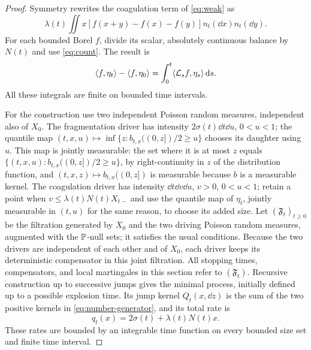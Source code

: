 \begin{proof}
Symmetry rewrites the coagulation term of \eqref{eq:weak} as
\[
 \lambda(t)\iint x[f(x+y)-f(x)-f(y)]n_t(\dd x)n_t(\dd y).
\]
For each bounded Borel $f$, divide its scalar, absolutely continuous
balance by $N(t)$ and use \eqref{eq:count}. The result is
\begin{equation}
 \langle f,\eta_t\rangle-\langle f,\eta_0\rangle
 =\int_0^t\langle \mathcal L_s f,\eta_s\rangle\,\mathrm d s.
 \label{eq:number-forward}
\end{equation}
All these integrals are finite on bounded time intervals.

For the construction use two independent Poisson random measures,
independent also of $X_0$. The fragmentation driver has intensity
$2\sigma(t)\dd t\dd u$, $0<u<1$; the quantile map
$(t,x,u)\mapsto\inf\{z:b_{t,x}((0,z])/2\geq u\}$ chooses its
daughter using $u$. This map is jointly measurable: the set where
it is at most $z$ equals $\{(t,x,u):b_{t,x}((0,z])/2\geq u\}$,
by right-continuity in $z$ of the distribution function, and
$(t,x,z)\mapsto b_{t,x}((0,z])$ is measurable because $b$ is a
measurable kernel. The coagulation driver has
intensity $\dd t\dd v\dd u$, $v>0$, $0<u<1$; retain a point when
$v\leq\lambda(t)N(t)X_{t-}$ and use the quantile map of $\eta_t$,
jointly measurable in $(t,u)$ for the same reason, to choose its
added size. Let $(\mathfrak F_t)_{t\geq0}$ be the filtration
generated by $X_0$ and the two driving Poisson random measures,
augmented with the $\mathbb P$-null sets; it satisfies the usual
conditions. Because the two drivers are independent of each other
and of $X_0$, each driver keeps its deterministic compensator in
this joint filtration. All stopping times, compensators, and local
martingales in this section refer to $(\mathfrak F_t)$.
Recursive construction
up to successive jumps gives the minimal process, initially defined
up to a possible explosion time. Its jump kernel $Q_t(x,\dd z)$ is
the sum of the two positive kernels in \eqref{eq:number-generator},
and its total rate is
\begin{equation}
 q_t(x)=2\sigma(t)+\lambda(t)N(t)x.
 \label{eq:number-total-rate}
\end{equation}
These rates are bounded by an integrable time function on every
bounded size set and finite time interval.


\end{proof}
